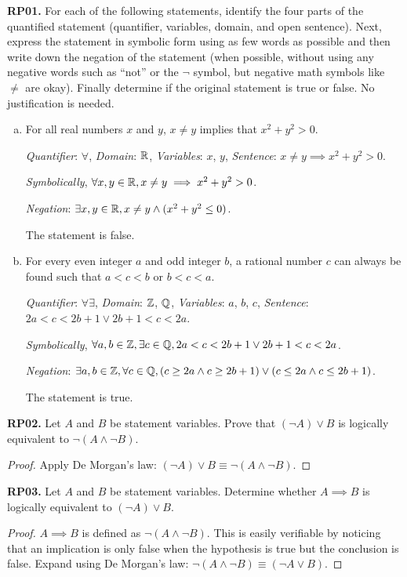\documentclass[11pt]{article}
\begin{document}
\textbf{RP01.} For each of the following statements, identify the four parts of the quantified statement (quantifier, variables, domain, and open sentence).
Next, express the statement in symbolic form using as few words as possible and then write down the negation of the statement
(when possible, without using any negative words such as “not” or the $\lnot$ symbol, but negative math symbols like $\neq$ are okay).
Finally determine if the original statement is true or false. No justification is needed.

\begin{enumerate}[(a)]
  \item For all real numbers $x$ and $y$, $x \neq y$ implies that $x^2 + y^2 > 0$.

        \emph{Quantifier}: $\forall$, \emph{Domain}: $\mathbb{R}$, \emph{Variables}: $x$, $y$, \emph{Sentence}: $x \neq y \implies x^2 + y^2 > 0$.

        \emph{Symbolically}, $\forall x,y\in\mathbb{R}, x\neq y\implies x^2+y^2>0$.

        \emph{Negation}: $\exists x,y\in\mathbb{R}, x\neq y \land (x^2+y^2\leq 0)$.

        The statement is false.

  \item For every even integer $a$ and odd integer $b$, a rational number $c$ can always be found such that $a < c < b$ or $b < c < a$.

        \emph{Quantifier}: $\forall\exists$, \emph{Domain}: $\mathbb{Z}$, $\mathbb{Q}$, \emph{Variables}: $a$, $b$, $c$, \emph{Sentence}: $2a < c < 2b+1 \lor 2b+1 < c < 2a$.

        \emph{Symbolically}, $\forall a,b\in\mathbb{Z}, \exists c\in\mathbb{Q}, 2a < c < 2b+1 \lor 2b+1 < c < 2a$.

        \emph{Negation}: $\exists a,b\in\mathbb{Z}, \forall c\in\mathbb{Q}, (c \geq 2a \land c \geq 2b+1) \lor (c \leq 2a \land c \leq 2b+1)$.

        The statement is true.
\end{enumerate}


\textbf{RP02.} Let $A$ and $B$ be statement variables. Prove that $(\lnot A) \lor B$ is logically equivalent to $\lnot(A \land \lnot B)$.
\begin{proof}
  Apply De Morgan's law: $(\lnot A) \lor B \equiv \lnot(A \land \lnot B)$.
\end{proof}


\textbf{RP03.} Let $A$ and $B$ be statement variables. Determine whether $A \implies B$ is logically equivalent to $(\lnot A) \lor B$.
\begin{proof}
  $A \implies B$ is defined as $\lnot(A \land \lnot B)$.
  This is easily verifiable by noticing that an implication is only false when the hypothesis is true but the conclusion is false.
  Expand using De Morgan's law: $\lnot(A \land \lnot B) \equiv (\lnot A \lor B)$.
\end{proof}
\end{document}
